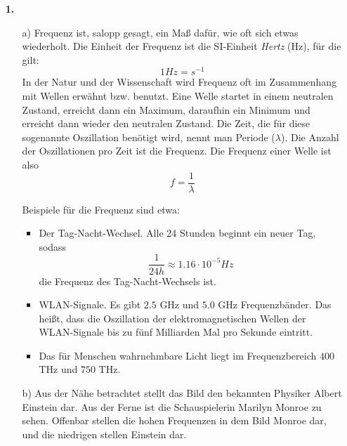 \documentclass [a4paper,11pt]{article}
\author{\authorinfotitle}
\title{\titleinfo}
\date{\today}
\begin{document}
\maketitle
    \begin{enumerate}
        \item[\textbf{1.}]
            \begin{enumerate}
                \item[a)]
                Frequenz ist, salopp gesagt, ein Maß dafür, wie oft sich etwas wiederholt.
                Die Einheit der Frequenz ist die SI-Einheit \textit{Hertz} (Hz), für die gilt:
                $$1 Hz = s^{-1}$$
                In der Natur und der Wissenschaft wird Frequenz oft im Zusammenhang mit Wellen
                erwähnt bzw. benutzt. Eine Welle startet in einem neutralen Zustand,
                erreicht dann ein Maximum, daraufhin ein Minimum und erreicht dann wieder den
                neutralen Zustand. Die Zeit, die für diese sogenannte Oszillation benötigt wird,
                nennt man Periode ($\lambda$). Die Anzahl der Oszillationen pro Zeit ist die Frequenz.
                Die Frequenz einer Welle ist also $$ f = \frac{1}{\lambda} $$

                Beispiele für die Frequenz sind etwa:

                \begin{itemize}
                    \item Der Tag-Nacht-Wechsel. Alle 24 Stunden beginnt ein neuer Tag, sodass
                        $$ \frac{1}{24h} \approx 1.16 \cdot 10^{-5} Hz $$
                        die Frequenz des Tag-Nacht-Wechsels ist.
                    \item WLAN-Signale. Es gibt $2.5$ GHz und $5.0$ GHz Frequenzbänder. Das heißt,
                        dass die Oszillation der elektromagnetischen Wellen der WLAN-Signale bis zu
                        fünf Milliarden Mal pro Sekunde eintritt.
                    \item Das für Menschen wahrnehmbare Licht liegt im Frequenzbereich $400$ THz
                        und $750$ THz.
                \end{itemize}

                \item[b)]
                Aus der Nähe betrachtet stellt das Bild den bekannten Physiker Albert Einstein dar.
                Aus der Ferne ist die Schauspielerin Marilyn Monroe zu sehen.
                Offenbar stellen die hohen Frequenzen in dem Bild Monroe dar, und die
                niedrigen stellen Einstein dar.
            \end{enumerate}
    \end{enumerate}
\end{document}
